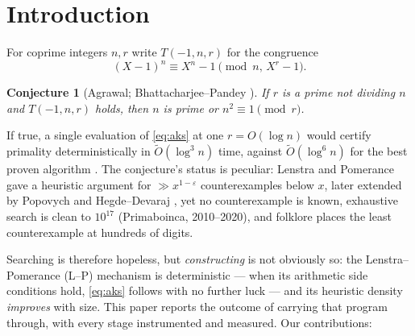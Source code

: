 \documentclass[11pt]{article}
\newtheorem{conjecture}[theorem]{Conjecture}
\theoremstyle{remark}
\begin{document}
\section{Introduction}\label{sec:intro}

For coprime integers $n, r$ write $T(-1,n,r)$ for the congruence
\begin{equation}\label{eq:aks}
(X-1)^n \equiv X^n - 1 \pmod{n,\, X^r-1}.
\end{equation}

\begin{conjecture}[Agrawal; Bhattacharjee--Pandey \cite{BP01}]\label{conj:agrawal}
If $r$ is a prime not dividing $n$ and $T(-1,n,r)$ holds, then $n$ is prime
or $n^2 \equiv 1 \pmod r$.
\end{conjecture}

If true, a single evaluation of \eqref{eq:aks} at one $r = O(\log n)$ would
certify primality deterministically in $\tilde O(\log^3 n)$ time, against
$\tilde O(\log^6 n)$ for the best proven algorithm \cite{LP2019}. The
conjecture's status is peculiar: Lenstra and Pomerance \cite{LPremarks}
gave a heuristic argument for $\gg x^{1-\varepsilon}$ counterexamples below
$x$, later extended by Popovych \cite{Popovych09} and Hegde--Devaraj
\cite{HD21}, yet no counterexample is known, exhaustive search is clean to
$10^{17}$ (Primaboinca, 2010--2020), and folklore places the least
counterexample at hundreds of digits.

Searching is therefore hopeless, but \emph{constructing} is not obviously
so: the Lenstra--Pomerance (L--P) mechanism is deterministic --- when its
arithmetic side conditions hold, \eqref{eq:aks} follows with no further
luck --- and its heuristic density \emph{improves} with size. This paper
reports the outcome of carrying that program through, with every stage
instrumented and measured. Our contributions:
\end{document}
